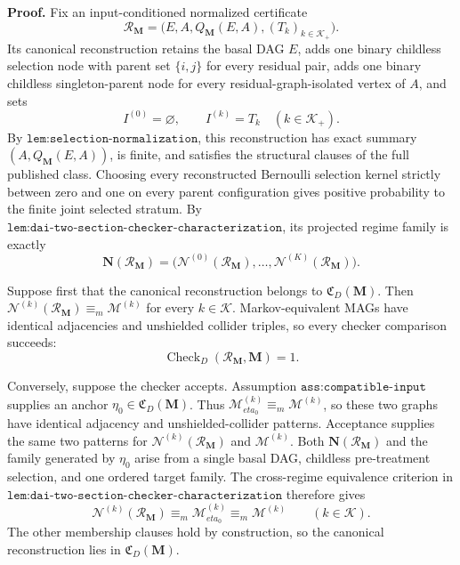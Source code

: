 \textbf{Proof.}
Fix an input-conditioned normalized certificate
\[
\mathcal R_{\mathbf M}
=\bigl(E,A,Q_{\mathbf M}(E,A),(T_k)_{k\in\mathcal K_+}\bigr).
\]
Its canonical reconstruction retains the basal DAG \(E\), adds one binary childless selection node with parent set \(\{i,j\}\) for every residual pair, adds one binary childless singleton-parent node for every residual-graph-isolated vertex of \(A\), and sets
\[
I^{(0)}=\varnothing,
\qquad
I^{(k)}=T_k\quad(k\in\mathcal K_+).
\]
By \(\texttt{lem:selection-normalization}\), this reconstruction has exact summary \((A,Q_{\mathbf M}(E,A))\), is finite, and satisfies the structural clauses of the full published class.  Choosing every reconstructed Bernoulli selection kernel strictly between zero and one on every parent configuration gives positive probability to the finite joint selected stratum.  By \(\texttt{lem:dai-two-section-checker-characterization}\), its projected regime family is exactly
\[
\mathbf N(\mathcal R_{\mathbf M})
=\bigl(\mathcal N^{(0)}(\mathcal R_{\mathbf M}),\ldots,
\mathcal N^{(K)}(\mathcal R_{\mathbf M})\bigr).
\]

Suppose first that the canonical reconstruction belongs to \(\mathfrak C_D(\mathbf M)\).  Then \(\mathcal N^{(k)}(\mathcal R_{\mathbf M})\equiv_m\mathcal M^{(k)}\) for every \(k\in\mathcal K\).  Markov-equivalent MAGs have identical adjacencies and unshielded collider triples, so every checker comparison succeeds:
\[
\operatorname{Check}_{D}(\mathcal R_{\mathbf M},\mathbf M)=1.
\]

Conversely, suppose the checker accepts.  Assumption \(\texttt{ass:compatible-input}\) supplies an anchor \(\eta_0\in\mathfrak C_D(\mathbf M)\).  Thus \(\mathcal M_{eta_0}^{(k)}\equiv_m\mathcal M^{(k)}\), so these two graphs have identical adjacency and unshielded-collider patterns.  Acceptance supplies the same two patterns for \(\mathcal N^{(k)}(\mathcal R_{\mathbf M})\) and \(\mathcal M^{(k)}\).  Both \(\mathbf N(\mathcal R_{\mathbf M})\) and the family generated by \(\eta_0\) arise from a single basal DAG, childless pre-treatment selection, and one ordered target family.  The cross-regime equivalence criterion in \(\texttt{lem:dai-two-section-checker-characterization}\) therefore gives
\[
\mathcal N^{(k)}(\mathcal R_{\mathbf M})
\equiv_m\mathcal M_{eta_0}^{(k)}
\equiv_m\mathcal M^{(k)}
\qquad(k\in\mathcal K).
\]
The other membership clauses hold by construction, so the canonical reconstruction lies in \(\mathfrak C_D(\mathbf M)\).

